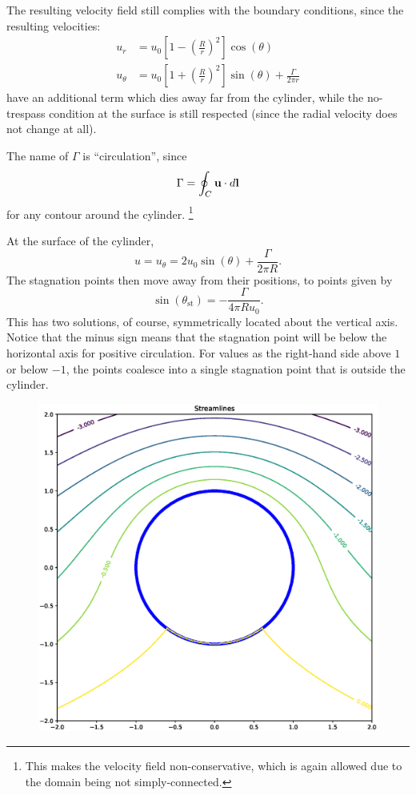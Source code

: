 The resulting velocity field still complies with the boundary
conditions, since the resulting velocities:
\begin{align}
u_r     &=   u_0  \left[ 1 - \left( \frac{R}{r}\right)^2 \right] \cos(\theta) \\
\label{eq:u_theta_cyl_pot_circ}
u_\theta &=   u_0  \left[ 1 + \left( \frac{R}{r}\right)^2 \right] \sin(\theta) +\frac{\Gamma}{2\pi r} 
\end{align}
have an additional term which dies away far from the cylinder, while
the no-trespass condition at the surface is still respected (since the
radial velocity does not change at all).

The name of $\Gamma$ is ``circulation'', since
\[
\Gamma = \oint_C \mathbf{u}\cdot d\mathbf{l}
\]
for any contour around the cylinder.%
\footnote{This makes the velocity
  field non-conservative, which is again allowed due to the domain
  being not simply-connected.}

At the surface of the cylinder,
\begin{equation}\label{eq:u_surface_cyl_pot_circ}
	u= u_\theta =  2 u_0  \sin(\theta) +\frac{\Gamma}{2\pi R} .
\end{equation}
The stagnation points then move away from their positions, to points given by
\begin{equation}\label{eq:u_stag_cyl_pot_circ}
	\sin(\theta_\mathrm{st})  = -\frac{\Gamma}{4\pi R u_0} .
\end{equation}
This has two solutions, of course, symmetrically located about the vertical axis.
Notice that the minus sign means that the
stagnation point will be below the horizontal axis for positive
circulation. For values as the right-hand side above $1$ or below $-1$,
the points coalesce into a single stagnation point that is outside the cylinder.

\begin{figure}
  \centering
  \includegraphics[width=0.4\linewidth]{figures/potential_flow_past_cylinder_rotating}
  \caption{\label{fig:}}
\end{figure}


